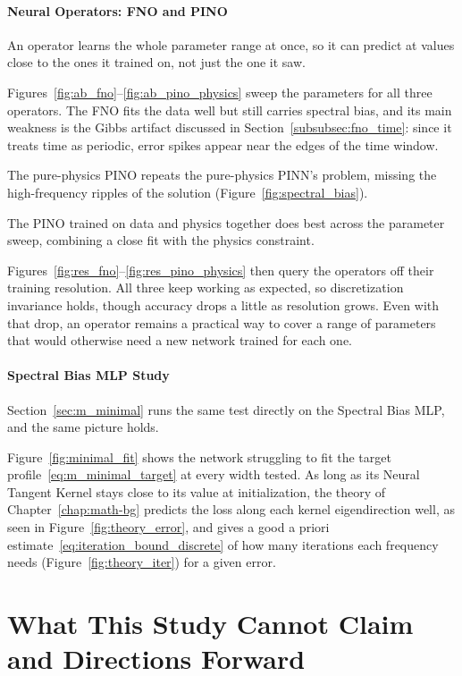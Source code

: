\paragraph{Neural Operators: FNO and PINO} An operator learns the whole parameter range at once, so it can predict at values close to the ones it trained on, not just the one it saw. 

Figures~\ref{fig:ab_fno}--\ref{fig:ab_pino_physics} sweep the parameters for all three operators. The FNO fits the data well but still carries spectral bias, and its main weakness is the Gibbs artifact discussed in Section~\ref{subsubsec:fno_time}: since it treats time as periodic, error spikes appear near the edges of the time window. 

The pure-physics PINO repeats the pure-physics PINN's problem, missing the high-frequency ripples of the solution (Figure~\ref{fig:spectral_bias}). 

The PINO trained on data and physics together does best across the parameter sweep, combining a close fit with the physics constraint.

Figures~\ref{fig:res_fno}--\ref{fig:res_pino_physics} then query the operators off their training resolution. All three keep working as expected, so discretization invariance holds, though accuracy drops a little as resolution grows. Even with that drop, an operator remains a practical way to cover a range of parameters that would otherwise need a new network trained for each one.

\paragraph{Spectral Bias MLP Study} Section~\ref{sec:m_minimal} runs the same test directly on the Spectral Bias MLP, and the same picture holds. 

Figure~\ref{fig:minimal_fit} shows the network struggling to fit the target profile~\eqref{eq:m_minimal_target} at every width tested. As long as its Neural Tangent Kernel stays close to its value at initialization, the theory of Chapter~\ref{chap:math-bg} predicts the loss along each kernel eigendirection well, as seen in Figure~\ref{fig:theory_error}, and gives a good a priori estimate~\eqref{eq:iteration_bound_discrete} of how many iterations each frequency needs (Figure~\ref{fig:theory_iter}) for a given error.

\section{What This Study Cannot Claim and Directions Forward}
\label{sec:c_limits}

